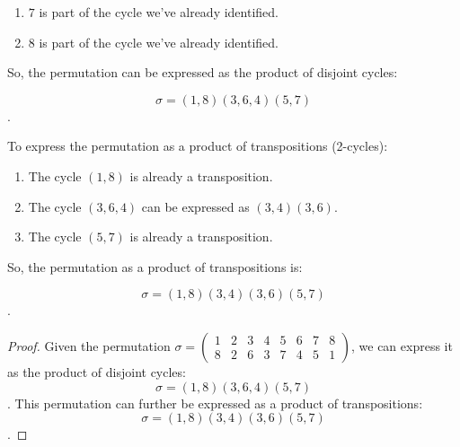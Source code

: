 \documentclass[12pt]{amsart}
\theoremstyle{definition}
\numberwithin{equation}{section}
\theoremstyle{plain}
\begin{document}
\begin{exercise}{10}
\begin{enumerate}
        \item \(7\) is part of the cycle we've already identified.
        
        \item \(8\) is part of the cycle we've already identified.
    \end{enumerate}
    
    So, the permutation can be expressed as the product of disjoint cycles:
    
    \[ \sigma = (1, 8)(3, 6, 4)(5, 7) \].
    
    To express the permutation as a product of transpositions (2-cycles):
    
    \begin{enumerate}
        \item The cycle \( (1, 8) \) is already a transposition.
        \item The cycle \( (3, 6, 4) \) can be expressed as \( (3, 4)(3, 6) \).
        \item The cycle \( (5, 7) \) is already a transposition.
    \end{enumerate}
    
    So, the permutation as a product of transpositions is:
    
    \[ \sigma = (1, 8)(3, 4)(3, 6)(5, 7) \].
    
    \begin{proof}
    Given the permutation \(\sigma = \begin{pmatrix} 1&2&3&4&5&6&7&8\\ 8&2&6&3&7&4&5&1 \end{pmatrix}\), we can express it as the product of disjoint cycles: \[ \sigma = (1, 8)(3, 6, 4)(5, 7) \]. This permutation can further be expressed as a product of transpositions: \[ \sigma = (1, 8)(3, 4)(3, 6)(5, 7) \].
    \end{proof}
\end{exercise}
\end{document}
